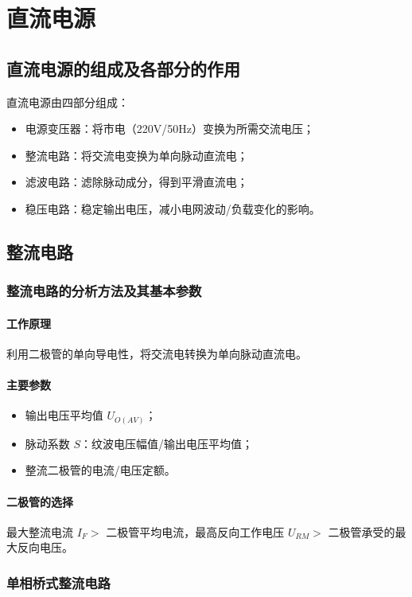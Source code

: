 \chapter{直流电源}

\section{直流电源的组成及各部分的作用}
直流电源由四部分组成：
\begin{itemize}
    \item 电源变压器：将市电（220V/50Hz）变换为所需交流电压；
    \item 整流电路：将交流电变换为单向脉动直流电；
    \item 滤波电路：滤除脉动成分，得到平滑直流电；
    \item 稳压电路：稳定输出电压，减小电网波动/负载变化的影响。
\end{itemize}

\section{整流电路}
\subsection{整流电路的分析方法及其基本参数}
\subsubsection{工作原理}
利用二极管的单向导电性，将交流电转换为单向脉动直流电。

\subsubsection{主要参数}
\begin{itemize}
    \item 输出电压平均值 $U_{O(AV)}$；
    \item 脉动系数 $S$：纹波电压幅值/输出电压平均值；
    \item 整流二极管的电流/电压定额。
\end{itemize}

\subsubsection{二极管的选择}
最大整流电流 $I_F >$ 二极管平均电流，最高反向工作电压 $U_{RM} >$ 二极管承受的最大反向电压。

\subsection{\texorpdfstring{单相桥式整流电路}{单相桥式整流电路}}
